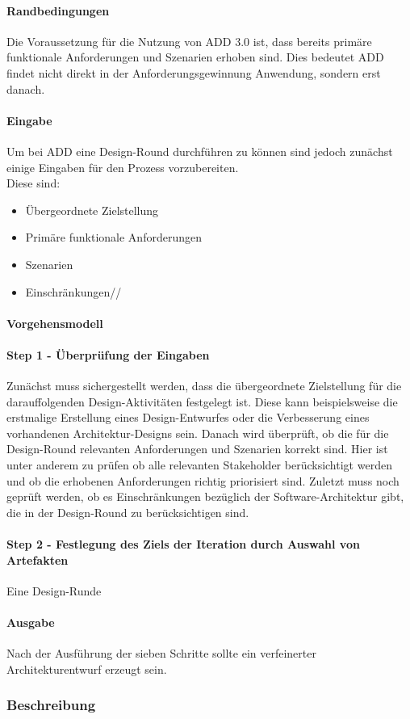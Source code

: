 \paragraph{Randbedingungen}
Die Voraussetzung für die Nutzung von ADD 3.0 ist, dass bereits primäre funktionale Anforderungen und Szenarien erhoben sind. Dies bedeutet ADD findet nicht direkt in der Anforderungsgewinnung Anwendung, sondern erst danach. \\

\paragraph{Eingabe}
Um bei ADD eine Design-Round durchführen zu können sind jedoch zunächst einige Eingaben für den Prozess vorzubereiten.\\

Diese sind:
\begin{itemize}
\item Übergeordnete Zielstellung
\item Primäre funktionale Anforderungen
\item Szenarien
\item Einschränkungen//
\end{itemize}

\paragraph{Vorgehensmodell}

\paragraph{Step 1 - Überprüfung der Eingaben}
Zunächst muss sichergestellt werden, dass die übergeordnete Zielstellung für die darauffolgenden Design-Aktivitäten festgelegt ist. Diese kann beispielsweise die erstmalige Erstellung eines Design-Entwurfes oder die Verbesserung eines vorhandenen Architektur-Designs sein. Danach wird überprüft, ob die für die Design-Round relevanten Anforderungen und Szenarien korrekt sind. Hier ist unter anderem zu prüfen ob alle relevanten Stakeholder berücksichtigt werden und ob die erhobenen Anforderungen richtig priorisiert sind. Zuletzt muss noch geprüft werden, ob es Einschränkungen bezüglich der Software-Architektur gibt, die in der Design-Round zu berücksichtigen sind.\\

\paragraph{Step 2 - Festlegung des Ziels der Iteration durch Auswahl von Artefakten}
Eine Design-Runde 

\paragraph{Ausgabe}
Nach der Ausführung der sieben Schritte sollte ein verfeinerter Architekturentwurf erzeugt sein.

\subsubsection{Beschreibung}